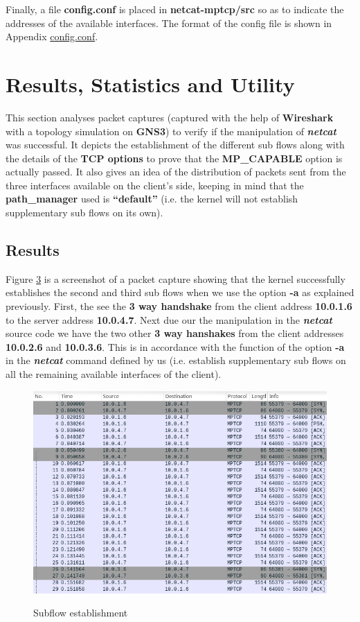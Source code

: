 \documentclass[a4paper,11pt]{article}
\begin{document}
			Finally, a file \textbf{config.conf} is placed in \textbf{netcat-mptcp/src} so as to indicate the addresses of the available interfaces. The format of the config file is shown in Appendix \hyperref[subsec:config.conf]{config.conf}.
			
	\clearpage
	\section{Results, Statistics and Utility}
		\label{sec:res}
		This section analyses packet captures (captured with the help of \textbf{Wireshark} with a topology simulation on \textbf{GNS3}) to verify if the manipulation of \textbf{\emph{netcat}} was successful. It depicts the establishment of the different sub flows along with the details of the \textbf{TCP options} to prove that the \textbf{MP\_CAPABLE} option is actually passed. It also gives an idea of the distribution of packets sent from the three interfaces available on the client's side, keeping in mind that the \textbf{path\_manager} used is \textbf{``default''} (i.e. the kernel will not establish supplementary sub flows on its own).
		\subsection{Results}
			\label{subsec:result}
			Figure \hyperref[fig:synack]{3} is a screenshot of a packet capture showing that the kernel successfully establishes the second and third sub flows when we use the option \textbf{-a} as explained previously. First, the see the \textbf{3 way handshake} from the client address \textbf{10.0.1.6} to the server address \textbf{10.0.4.7}. Next due our the manipulation in the \textbf{\emph{netcat}} source code we have the two other \textbf{3 way hanshakes} from the client addresses \textbf{10.0.2.6} and \textbf{10.0.3.6}. This is in accordance with the function of the option \textbf{-a} in the \textbf{\emph{netcat}} command defined by us (i.e. establish supplementary sub flows on all the remaining available interfaces of the client).
			\begin{figure}[h]
				\begin{center}
					\label{fig:synack}
					\includegraphics[scale=0.5]{pictures/synack.jpg}
					\caption[]{Subflow establishment}
				\end{center}
			\end{figure}
\end{document}
